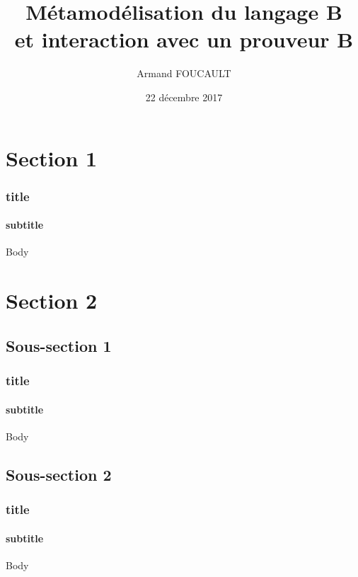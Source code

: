 \documentclass{beamer}
\title[Métamodélisation du langage B]{Métamodélisation du langage B\\ et interaction avec un prouveur B}
\author{Armand FOUCAULT}
\date{22 décembre 2017}
\begin{document}
\begin{frame}
    \titlepage
\end{frame}

\begin{frame}
    \tableofcontents
\end{frame}

\section{Section 1}

\begin{frame}
    \frametitle{title}
    \framesubtitle{subtitle}
    Body
\end{frame}

\section{Section 2}

\subsection{Sous-section 1}

\begin{frame}
    \frametitle{title}
    \framesubtitle{subtitle}
    Body
\end{frame}

\subsection{Sous-section 2}

\begin{frame}
    \frametitle{title}
    \framesubtitle{subtitle}
    Body
\end{frame}
\end{document}
